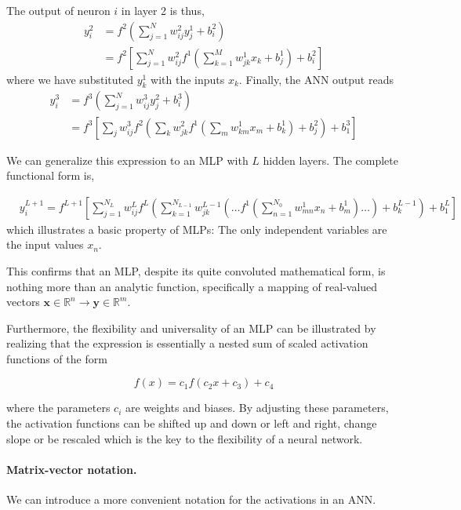 \documentclass[%
oneside,                 %
final,                   %
10pt]{article}
\begin{document}
The output of neuron $i$ in layer 2 is thus,
\begin{align}
 y_i^2 &= f^2\left(\sum_{j=1}^N w_{ij}^2 y_j^1 + b_i^2\right) \\
 &= f^2\left[\sum_{j=1}^N w_{ij}^2f^1\left(\sum_{k=1}^M w_{jk}^1 x_k + b_j^1\right) + b_i^2\right]
 \label{outputLayer2}
\end{align}
where we have substituted $y_k^1$ with the inputs $x_k$. Finally, the ANN output reads
\begin{align}
 y_i^3 &= f^3\left(\sum_{j=1}^N w_{ij}^3 y_j^2 + b_i^3\right) \\
 &= f^3\left[\sum_{j} w_{ij}^3 f^2\left(\sum_{k} w_{jk}^2 f^1\left(\sum_{m} w_{km}^1 x_m + b_k^1\right) + b_j^2\right)
  + b_1^3\right]
\end{align}

We can generalize this expression to an MLP with $L$ hidden
layers. The complete functional form is,

\begin{align}
&y^{L+1}_i = f^{L+1}\left[\!\sum_{j=1}^{N_L} w_{ij}^L f^L \left(\sum_{k=1}^{N_{L-1}}w_{jk}^{L-1}\left(\dots f^1\left(\sum_{n=1}^{N_0} w_{mn}^1 x_n+ b_m^1\right)\dots\right)+b_k^{L-1}\right)+b_1^L\right] &&
 \label{completeNN}
\end{align}
which illustrates a basic property of MLPs: The only independent
variables are the input values $x_n$.

This confirms that an MLP, despite its quite convoluted mathematical
form, is nothing more than an analytic function, specifically a
mapping of real-valued vectors $\boldsymbol{x} \in \mathbb{R}^n \rightarrow
\boldsymbol{y} \in \mathbb{R}^m$.

Furthermore, the flexibility and universality of an MLP can be
illustrated by realizing that the expression is essentially a nested
sum of scaled activation functions of the form

\begin{equation}
 f(x) = c_1 f(c_2 x + c_3) + c_4
\end{equation}

where the parameters $c_i$ are weights and biases. By adjusting these
parameters, the activation functions can be shifted up and down or
left and right, change slope or be rescaled which is the key to the
flexibility of a neural network.

\paragraph{Matrix-vector notation.}
We can introduce a more convenient notation for the activations in an ANN. 
\end{document}
